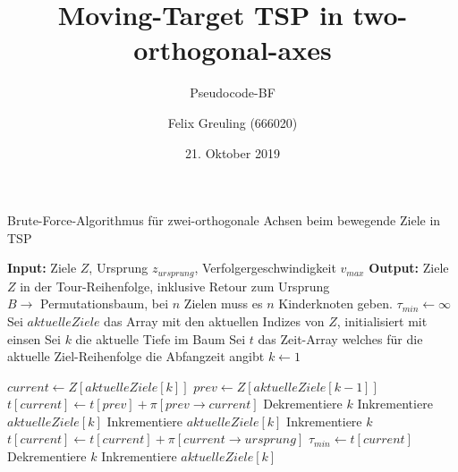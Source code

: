 \documentclass{scrartcl}
\title{Moving-Target TSP in two-orthogonal-axes}
\subtitle{Pseudocode-BF}
\author{Felix Greuling (666020)}
\date{21. Oktober 2019}
\begin{document}
\maketitle

\begin{minipage}{1\linewidth}
\begin{algorithm}[H]
\begin{algorithmic}
\caption{Brute-Force-Algorithmus für zwei-orthogonale Achsen beim bewegende Ziele in TSP}
\label{alg:BF}
\State \textbf{Input:} Ziele $Z$, Ursprung $z_{ursprung}$, Verfolgergeschwindigkeit $v_{max}$
\State \textbf{Output:} Ziele $Z$ in der Tour-Reihenfolge, inklusive Retour zum Ursprung\\

\State $B\rightarrow$ Permutationsbaum, bei $n$ Zielen muss es $n$ Kinderknoten geben.
\State $\tau_{min}\leftarrow \infty$
\State Sei $aktuelleZiele$ das Array mit den aktuellen Indizes von $Z$, initialisiert mit einsen
\State Sei $k$ die aktuelle Tiefe im Baum
\State Sei $t$ das Zeit-Array welches für die aktuelle Ziel-Reihenfolge die Abfangzeit angibt
\State $k\leftarrow 1$

\State $current\leftarrow Z[aktuelleZiele[k]]$
\State $prev\leftarrow Z[aktuelleZiele[k-1]]$
\State $t[current] \leftarrow t[prev] + \pi[prev\rightarrow current]$
\State Dekrementiere $k$
\State Inkrementiere $aktuelleZiele[k]$
\Else
\State Inkrementiere $aktuelleZiele[k]$ 
\EndIf
\Else
{}
\State Inkrementiere $k$
\Else
\State $t[current]\leftarrow t[current] + \pi[current\rightarrow ursprung]$ 
\State $\tau_{min}\leftarrow t[current]$
\State Dekrementiere $k$
\State Inkrementiere $aktuelleZiele[k]$
\EndIf 
\EndIf
\EndIf
\EndWhile
\end{algorithmic}
\end{algorithm}
\end{minipage}
\end{document}
